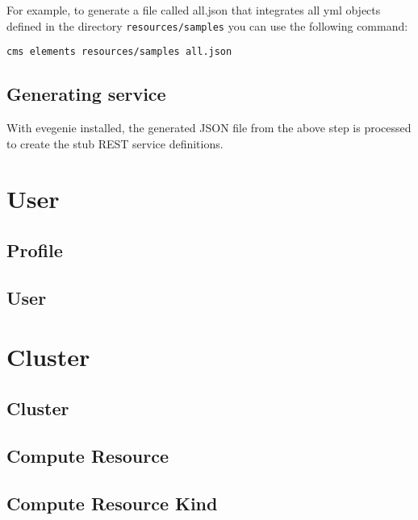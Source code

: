 \documentclass[9pt,twocolumn,twoside]{styles/osajnl}
\begin{document}
For example, to generate a file called all.json that integrates all
yml objects defined in the directory \verb+resources/samples+ you can
use the following command:

\begin{verbatim}
cms elements resources/samples all.json
\end{verbatim}


\subsection{Generating service}

With evegenie installed, the generated JSON file from the above step
is processed to create the stub REST service definitions.


\section{User}

\subsection{Profile}



\subsection{User}



\section{Cluster}

\subsection{Cluster}



\subsection{Compute Resource}



\subsection{Compute Resource Kind}
\end{document}
